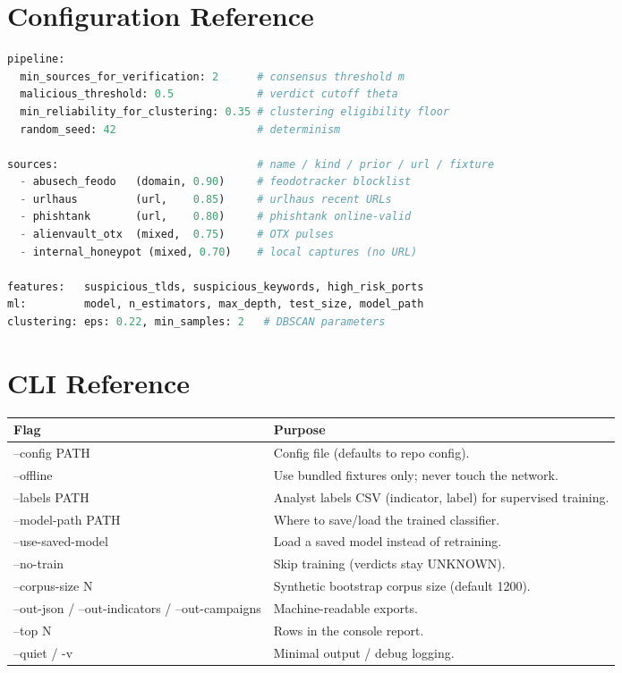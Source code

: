 \documentclass[11pt,a4paper]{article}
\begin{document}
\appendix
\section{Configuration Reference}
\begin{lstlisting}[language=Python]
pipeline:
  min_sources_for_verification: 2      # consensus threshold m
  malicious_threshold: 0.5             # verdict cutoff theta
  min_reliability_for_clustering: 0.35 # clustering eligibility floor
  random_seed: 42                      # determinism

sources:                               # name / kind / prior / url / fixture
  - abusech_feodo   (domain, 0.90)     # feodotracker blocklist
  - urlhaus         (url,    0.85)     # urlhaus recent URLs
  - phishtank       (url,    0.80)     # phishtank online-valid
  - alienvault_otx  (mixed,  0.75)     # OTX pulses
  - internal_honeypot (mixed, 0.70)    # local captures (no URL)

features:   suspicious_tlds, suspicious_keywords, high_risk_ports
ml:         model, n_estimators, max_depth, test_size, model_path
clustering: eps: 0.22, min_samples: 2   # DBSCAN parameters
\end{lstlisting}

\section{CLI Reference}
\begin{center}
\begin{tabularx}{\linewidth}{@{}>{\ttfamily\small}p{4.3cm}X@{}}
\toprule
\rowcolor{paper}\textbf{Flag} & \textbf{Purpose} \\
\midrule
--config PATH & Config file (defaults to repo config). \\
--offline & Use bundled fixtures only; never touch the network. \\
--labels PATH & Analyst labels CSV (indicator, label) for supervised training. \\
--model-path PATH & Where to save/load the trained classifier. \\
--use-saved-model & Load a saved model instead of retraining. \\
--no-train & Skip training (verdicts stay UNKNOWN). \\
--corpus-size N & Synthetic bootstrap corpus size (default 1200). \\
--out-json / --out-indicators / --out-campaigns & Machine-readable exports. \\
--top N & Rows in the console report. \\
--quiet / -v & Minimal output / debug logging. \\
\bottomrule
\end{tabularx}
\end{center}
\end{document}
